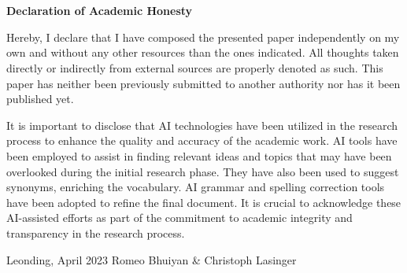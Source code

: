 \thispagestyle{empty}
\vspace{3cm}
~ \\ \\
\textbf{Declaration of Academic Honesty}

Hereby, I declare that I have composed the presented paper independently on my own
and without any other resources than the ones indicated. All thoughts taken directly or
indirectly from external sources are properly denoted as such.
This paper has neither been previously submitted to another authority nor has it
been published yet.

It is important to disclose that AI technologies have been utilized in the research 
process to enhance the quality and accuracy of the 
academic work. AI tools have been employed to assist in finding relevant ideas and topics that may 
have been overlooked during the initial research phase. They have also been used 
to suggest synonyms, enriching the vocabulary. AI grammar and spelling correction tools have been adopted to 
refine the final document. It is crucial to acknowledge 
these AI-assisted efforts as part of the commitment to academic integrity and 
transparency in the research process.
\vspace{3cm}
\begin{tabbing}
Leonding, April 2023 \hspace{5cm} Romeo Bhuiyan \& Christoph Lasinger
\end{tabbing}
\vspace{10cm}
\newpage
\setcounter{page}{1}
